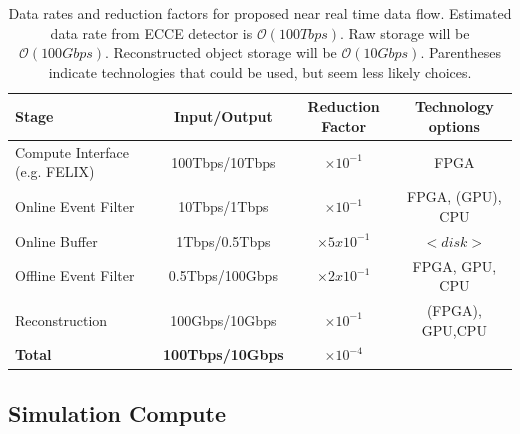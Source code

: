 \begin{table}[htb!]
    \centering
    \begin{tabular}{p{4cm}|c|c|c}
        \hline
        Stage                        & Input/Output    & Reduction Factor & Technology options \\
        \hline
        \hline
        Compute Interface (e.g. FELIX) & 100Tbps/10Tbps  & $\times 10^{-1}$ & FPGA \\
        \hline
        Online Event Filter          & 10Tbps/1Tbps    & $\times 10^{-1}$ & FPGA, (GPU), CPU\\
        \hline
        Online Buffer                & 1Tbps/0.5Tbps   & $\times 5x10^{-1}$  & $<disk>$ \\
        \hline
        Offline Event Filter         & 0.5Tbps/100Gbps & $\times 2x10^{-1}$  & FPGA, GPU, CPU \\
        \hline
        Reconstruction               & 100Gbps/10Gbps  & $\times 10^{-1}$ & (FPGA), GPU,CPU\\
        \hline
        \hline
        \textbf{Total}               & \textbf{100Tbps/10Gbps} & \textbf{$\times 10^{-4}$} & \\
        \hline
    \end{tabular}
    \caption{Data rates and reduction factors for proposed near real time data flow. Estimated data rate from ECCE detector is $\mathcal{O}(100Tbps)$. Raw storage will be $\mathcal{O}(100Gbps)$. Reconstructed object storage will be $\mathcal{O}(10Gbps)$. Parentheses indicate technologies that could be used, but seem less likely choices.}
    \label{tab:reduction_factors}
\end{table}

\subsection{Simulation Compute}

